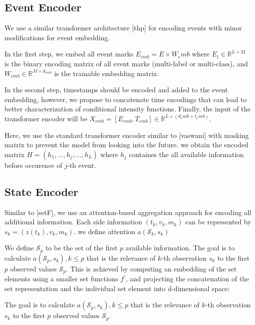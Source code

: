 \documentclass[journal,twoside,web]{ieeecolor}
\begin{document}
\subsection{Event Encoder}
We use a similar transformer architecture [thp] for encoding events with minor modifications for event embedding.


In the first step, we embed all event marks $E_{emb}=E \times W_emb$ where $E_i \in \mathbb{R}^{L \times M}$ is the binary encoding matrix of all event marks (multi-label or multi-class), and  $ W_{emb} \in  \mathbb{R}^{M \times d_{emb} }  $ is the trainable embedding matrix. 

In the second step, timestamps should be encoded and added to the event embedding, however, we propose to concatenate time encodings that can lead to better characterization of conditional intensity functions. Finally, the input of the transformer encoder will be $X_{emb}=[E_{emb}, T_{emb}] \in \mathbb{R}^{L \times (d_emb+t_emb)}$.

Here, we use the standard transformer encoder similar to [vaswani] with masking matrix to prevent the model from looking into the future. we obtain the encoded matrix  $ H=(h_1, ..., h_j, ..., h_L) $ where $h_j$ containes the all available information before occurence of $j$-th event.






\subsection{State Encoder}

Similar to [setF], we use an attention-based aggregation approach for encoding all additional information. Each side information  $ (t_k, v_k, m_k) $ can be represented by $s_k=(z(t_k), v_k, m_k)$. we define attention $a(\mathcal{S}_k,s_k )$

We define $\mathcal{S}_p$ to be the set of the first $p$ available information.
The goal is to calculate $a(\mathcal{S}_p,s_k ), k \leq p$ that is the relevance of $k$-th observation $s_k$ to the first $p$ observed values $\mathcal{S}_p$.
This is achieved by computing an embedding of the set elements using a smaller set functions $f^{\prime}$, and projecting the concatenation of the set representation and the individual set element into d-dimensional space:


The goal is to calculate $a(\mathcal{S}_p,s_k ), k \leq p$ that is the relevance of $k$-th observation $s_k$ to the first $p$ observed values $\mathcal{S}_p$.
\end{document}
